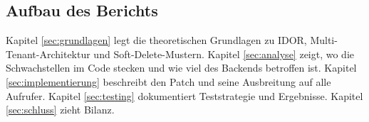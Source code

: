 \subsection{Aufbau des Berichts}

Kapitel \ref{sec:grundlagen} legt die theoretischen Grundlagen zu IDOR,
Multi-Tenant-Architektur und Soft-Delete-Mustern.
Kapitel \ref{sec:analyse} zeigt, wo die Schwachstellen im Code stecken und
wie viel des Backends betroffen ist.
Kapitel \ref{sec:implementierung} beschreibt den Patch und seine Ausbreitung
auf alle Aufrufer.
Kapitel \ref{sec:testing} dokumentiert Teststrategie und Ergebnisse.
Kapitel \ref{sec:schluss} zieht Bilanz.
